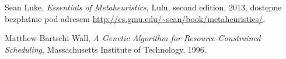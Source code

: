 \documentclass[12pt,a4paper]{article}
\theoremstyle{definition}
\begin{document}
\newpage
\begin{thebibliography}{9}
	Sean Luke,
	\emph{Essentials of Metaheuristics},
	Lulu,
	second edition,
	2013,
	dostępne bezpłatnie pod adresem \url{http://cs.gmu.edu/~sean/book/metaheuristics/}.

	Matthew Bartschi Wall,
	\emph{A Genetic Algorithm for Resource-Constrained Scheduling},
	Massachusetts Institute of Technology,
	1996.
\end{thebibliography}
\end{document}
